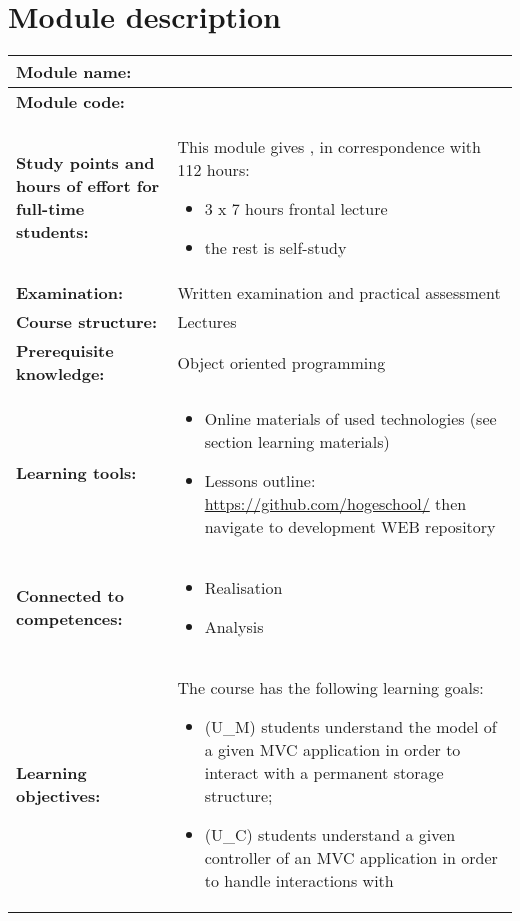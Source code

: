 \section*{Module description}
\begin{tabularx}{\textwidth}{|>{\columncolor{lichtGrijs}} p{}|X|}
	\hline
	\textbf{Module name:} & \modulenaam\\
	\hline
	\textbf{Module code: }& \modulecode\\
	\hline
	\textbf{Study points \newline and hours of effort for full-time students:} & This module gives \stdPunten, in correspondence with 112 hours:
	\begin{itemize}
		\item 3 x 7 hours frontal lecture
		\item the rest is self-study
	\end{itemize} \\
	\hline
	\textbf{Examination:} & Written examination and practical assessment \\
	\hline
	\textbf{Course structure:} & Lectures\\
	\hline
	\textbf{Prerequisite knowledge:} & Object oriented programming \\
	\hline
	\textbf{Learning tools:} & \begin{itemize}
			\item  Online materials of used technologies (see section learning materials) 
			\item  Lessons outline: 
  \url{https://github.com/hogeschool/} then navigate to development WEB repository
		\end{itemize} \\
	\hline
	\textbf{Connected to \newline competences:} & \begin{itemize}
			\item Realisation
			\item Analysis
		\end{itemize} \\
	\hline
	\textbf{Learning objectives:} &
		The course has the following learning goals: 
			\begin{itemize}
					\item (U\_M) students understand the model of a given MVC application in order to interact with a permanent storage structure; 
					\item (U\_C) students understand a given controller of an MVC application in order to handle interactions with

\end{itemize}
\end{tabularx}
